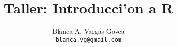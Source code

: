 \documentclass[11pt]{report}
\begin{document}
\title{\textbf{\huge{Taller: Introducci'on a R}}}
\author{Blanca A. Vargas Govea\\\texttt{blanca.vg@gmail.com}}
\date{}
\maketitle
\tableofcontents







%

\end{document}
